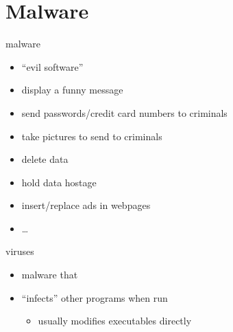 \begin{frame}
    \titlepage
\end{frame}

\section{Malware}

{ %
    \begin{frame}[plain]
    \end{frame}
}

\begin{frame}{malware}
    \begin{itemize}
    \item ``evil software''
    \item<2-> display a funny message
    \item<2-> send passwords/credit card numbers to criminals
    \item<2-> take pictures to send to criminals
    \item<2-> delete data
    \item<2-> hold data hostage
    \item<2-> insert/replace ads in webpages
    \item<2-> \ldots
    \end{itemize}
\end{frame}


\begin{frame}{viruses}
    \begin{itemize}
    \item malware that 
    \item ``infects'' other programs when run
    \begin{itemize}
    \item usually modifies executables directly
    \end{itemize}
    \end{itemize}
\end{frame}

